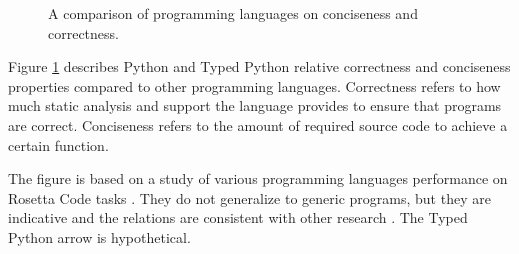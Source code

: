 \begin{figure}[h]
    \centering
    \caption{A comparison of programming languages on conciseness and correctness.}
    \label{fig:language_comparison}
\end{figure}

Figure \ref{fig:language_comparison} describes Python and Typed Python relative correctness and conciseness properties compared to other programming languages. Correctness refers to how much static analysis and support the language provides to ensure that programs are correct. Conciseness refers to the amount of required source code to achieve a certain function.

The figure is based on a study of various programming languages performance on Rosetta Code tasks \cite{nanz_comparative_2015}. They do not generalize to generic programs, but they are indicative and the relations are consistent with other research \cite{ray_codequality_2014}. The Typed Python arrow is hypothetical.
